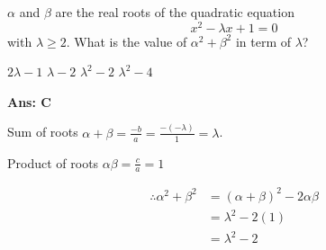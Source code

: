 \documentclass[varwidth=70mm]{standalone}
\begin{document}
$\alpha$ and $\beta$ are the real roots of the quadratic equation $$x^2-\lambda x+1=0$$ with $\lambda\ge 2$. What is the value of $\alpha^2 +\beta^2$ in term of $\lambda$?
\begin{choices}
\choice $2\lambda - 1$
\choice $\lambda - 2$
\choice $\lambda^2 - 2$
\choice $\lambda^2 - 4$
\end{choices}

\begin{answer}
\hrulefill\par
\textbf{Ans: C}

Sum of roots $\alpha+\beta=\frac{-b}{a}=\frac{-(-\lambda)}{1}=\lambda$.

Product of roots $\alpha\beta=\frac{c}{a}=1$

\begin{equation*}
\begin{aligned}
\therefore\alpha^2 +\beta^2 &= \left(\alpha+\beta\right)^2 - 2\alpha\beta \\
				  &= \lambda^2 - 2(1) \\
				  &= \lambda^2 - 2
\end{aligned}
\end{equation*}
\end{answer}
\end{document}
